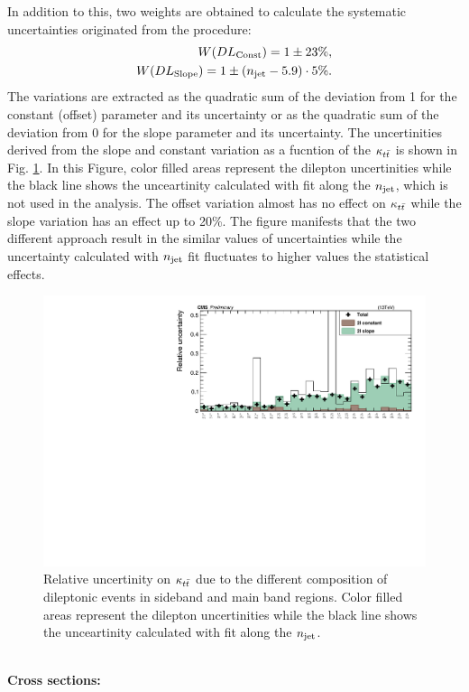 In addition to this, two weights are obtained to calculate the systematic uncertainties originated from the procedure:
\begin{eqnarray}
W(DL_{\rm Const}) = 1\pm23\%,\\
W(DL_{\rm Slope}) = 1\pm(n_{\rm jet}-5.9) \cdot 5\%.
\end{eqnarray}
The variations are extracted as the quadratic sum of the deviation from 1 for the constant (offset) parameter and its uncertainty or as the quadratic sum of the deviation from 0 for the slope parameter and its uncertainty.
The uncertinities derived from the slope and constant variation as a fucntion of the $\kappa_{t\bar{t}}$ is shown in Fig. \ref{fig:systDL}. In this Figure, color filled areas represent the dilepton uncertinities while the black line shows the unceartinity calculated with fit along the $n_{\rm jet}$, which is not used in the analysis. The offset variation almost has no effect on $\kappa_{t\bar{t}}$ while the slope variation has an effect up to 20\%. The figure manifests that the two different approach result in the similar values of uncertainties while the uncertainty calculated with $n_{\rm jet}$ fit fluctuates to higher values the statistical effects. 
\begin{figure}[!hbt]
    \begin{center}
 \includegraphics[width=0.8 \textwidth]{Plots/analysis/RCS/diLepCR/DL_comp}
  \caption{ \label{fig:systDL} Relative uncertinity on $\kappa_{t\bar{t}}$ due to the different composition of dileptonic events in sideband and main band regions. Color filled areas represent the dilepton uncertinities while the black line shows the unceartinity calculated with fit along the $n_{\rm jet}$.}
  \end{center}
\end{figure}
\\
\textbf{Cross sections:}\\
